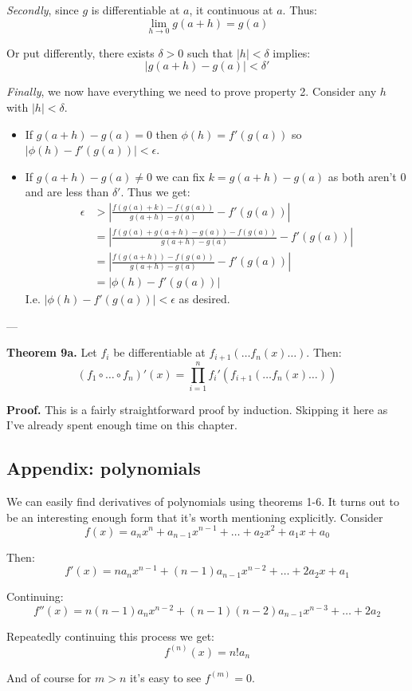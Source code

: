 \textit{Secondly}, since $g$ is differentiable at $a$, it continuous
at $a$. Thus:
\[\lim_{h\to0}g(a+h)=g(a)\]

Or put differently, there exists $\delta>0$ such that $|h|<\delta$ implies:
\[|g(a+h)-g(a)|<\delta'\]

\textit{Finally}, we now have everything we need to prove property 2.
Consider any $h$ with $|h|<\delta$.
\begin{itemize}
\item If $g(a+h)-g(a)=0$ then $\phi(h)=f'(g(a))$ so $|\phi(h)-f'(g(a))|<\epsilon$.
\item If $g(a+h)-g(a)\neq0$ we can fix $k=g(a+h)-g(a)$ as both aren't
  $0$ and are less than $\delta'$. Thus we get:
\begin{align*}
  \epsilon&>\left|\frac{f(g(a)+k)-f(g(a))}{g(a+h)-g(a)}-f'(g(a))\right|\\
  &=\left|\frac{f(g(a)+g(a+h)-g(a))-f(g(a))}{g(a+h)-g(a)}-f'(g(a))\right|\\
  &=\left|\frac{f(g(a+h))-f(g(a))}{g(a+h)-g(a)}-f'(g(a))\right|\\
  &=\left|\phi(h)-f'(g(a))\right|
\end{align*}
I.e. $\left|\phi(h)-f'(g(a))\right|<\epsilon$ as desired.
\end{itemize}

\vs---\vs

\textbf{Theorem 9a.} Let $f_i$ be differentiable at
$f_{i+1}(\dots f_n(x) \dots)$. Then:
\[(f_1\circ \ldots\circ f_n)'(x) = \prod_{i=1}^{n} f_i' \left( f_{i+1}(\dots f_n(x) \dots) \right)\]

\vs

\textbf{Proof.} This is a fairly straightforward proof by induction.
Skipping it here as I've already spent enough time on this chapter.

\subsection{Appendix: polynomials}
We can easily find derivatives of polynomials using theorems 1-6. It
turns out to be an interesting enough form that it's worth mentioning
explicitly. Consider
\[f(x)=a_nx^n+a_{n-1}x^{n-1}+\ldots+a_2x^2+a_1x+a_0\]

Then:
\[f'(x)=na_nx^{n-1}+(n-1)a_{n-1}x^{n-2}+\ldots+2a_2x+a_1\]

Continuing:
\[f''(x)=n(n-1)a_nx^{n-2}+(n-1)(n-2)a_{n-1}x^{n-3}+\ldots+2a_2\]

Repeatedly continuing this process we get:
\[f^{(n)}(x)=n!a_n\]

And of course for $m>n$ it's easy to see $f^{(m)}=0$.

